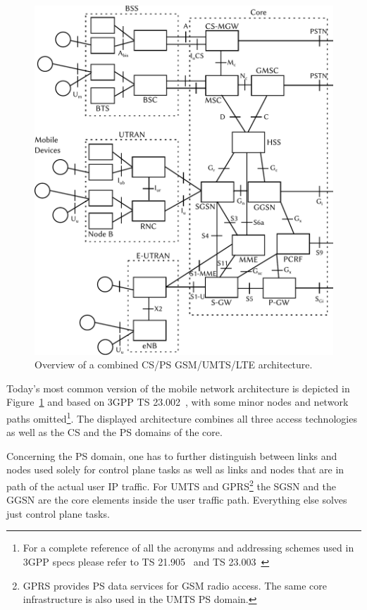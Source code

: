 \begin{figure}[htbp]
	\centering
	\includegraphics[width=1.0\textwidth]{images/3gpp-physical-arch.pdf}
	\caption{Overview of a combined \acrshort{CS}/\acrshort{PS} \acrshort{GSM}/\acrshort{UMTS}/\acrshort{LTE} architecture.}
\label{c4:fig:psdomain}
\end{figure}

Today's most common version of the mobile network architecture is depicted in Figure~\ref{c4:fig:psdomain} and based on \gls{3GPP} \gls{TS} 23.002~\cite{3gpp.23.002}, with some minor nodes and network paths omitted\footnote{For a complete reference of all the acronyms and addressing schemes used in \gls{3GPP} specs please refer to \gls{TS} 21.905~\cite{3gpp.21.905} and \gls{TS} 23.003~\cite{3gpp.23.003}}. The displayed architecture combines all three access technologies as well as the \gls{CS} and the \gls{PS} domains of the core. 

Concerning the \gls{PS} domain, one has to further distinguish between links and nodes used solely for control plane tasks as well as links and nodes that are in path of the actual user \gls{IP} traffic. For \gls{UMTS} and \gls{GPRS}\footnote{\gls{GPRS} provides \gls{PS} data services for \gls{GSM} radio access. The same core infrastructure is also used in the \gls{UMTS} \gls{PS} domain.} the \gls{SGSN} and the \gls{GGSN} are the core elements inside the user traffic path. Everything else solves just control plane tasks.

